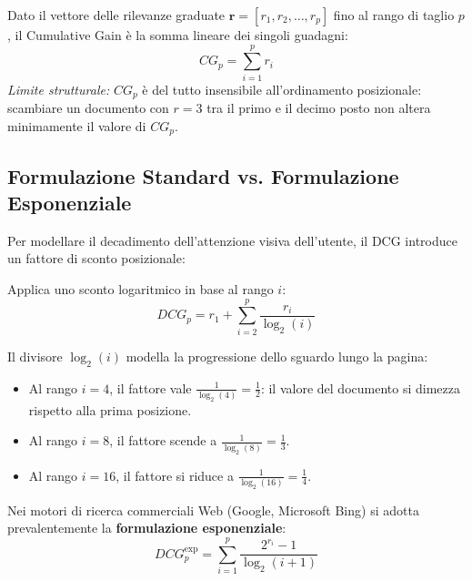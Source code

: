 \begin{definition}
Dato il vettore delle rilevanze graduate $\mathbf{r} = [r_1, r_2, \dots, r_p]$ fino al rango di taglio $p$, il Cumulative Gain \`e la somma lineare dei singoli guadagni:
\begin{equation}
CG_p = \sum_{i=1}^p r_i
\end{equation}
\textit{Limite strutturale:} $CG_p$ \`e del tutto insensibile all'ordinamento posizionale: scambiare un documento con $r=3$ tra il primo e il decimo posto non altera minimamente il valore di $CG_p$.
\end{definition}

\FloatBarrier
\subsection{Formulazione Standard vs. Formulazione Esponenziale}
\label{subsec:dcg-standard-vs-exp}

Per modellare il decadimento dell'attenzione visiva dell'utente, il DCG introduce un fattore di sconto posizionale:

\begin{definition}
Applica uno sconto logaritmico in base al rango $i$:
\begin{equation}
DCG_p = r_1 + \sum_{i=2}^p \frac{r_i}{\log_2(i)}
\label{eq:dcg-standard}
\end{equation}
\end{definition}

\begin{property}
Il divisore $\log_2(i)$ modella la progressione dello sguardo lungo la pagina:
\begin{itemize}
    \item Al rango $i = 4$, il fattore vale $\frac{1}{\log_2(4)} = \frac{1}{2}$: il valore del documento si dimezza rispetto alla prima posizione.
    \item Al rango $i = 8$, il fattore scende a $\frac{1}{\log_2(8)} = \frac{1}{3}$.
    \item Al rango $i = 16$, il fattore si riduce a $\frac{1}{\log_2(16)} = \frac{1}{4}$.
\end{itemize}
\end{property}

Nei motori di ricerca commerciali Web (Google, Microsoft Bing) si adotta prevalentemente la \textbf{formulazione esponenziale}:
\begin{equation}
DCG_p^{\text{exp}} = \sum_{i=1}^p \frac{2^{r_i} - 1}{\log_2(i + 1)}
\label{eq:dcg-exp}
\end{equation}

